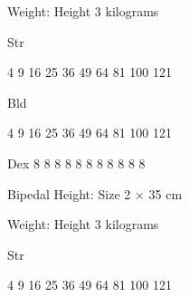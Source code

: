 \documentclass[twoside]{book}
\begin{document}
                  
                  
                    
                      Weight:     
                     Height  3    kilograms
                         
                    
                  
                  
                   Str   
                  
                    
                    
                   4   
                   9   
                   16   
                   25   
                   36   
                   49   
                   64   
                   81   
                   100   
                   121   
                  
                  
                   Bld   
                  
                    
                    
                   4   
                   9   
                   16   
                   25   
                   36   
                   49   
                   64   
                   81   
                   100   
                   121   
                  
                  
                   Dex   
                   8   
                   8   
                   8   
                   8   
                   8   
                   8   
                   8   
                   8   
                   8   
                   8   
                   8   
                  
                  
                   Bipedal   
                    Height:     
                         Size  2 
                             ×  35  cm
                               
                    
                  
                  
                    
                     Weight:     
                     Height  3    kilograms
                         
                    
                  
                  
                   Str   
                  
                    
                    
                   4   
                   9   
                   16   
                   25   
                   36   
                   49   
                   64   
                   81   
                   100   
                   121   
                  
\end{document}
